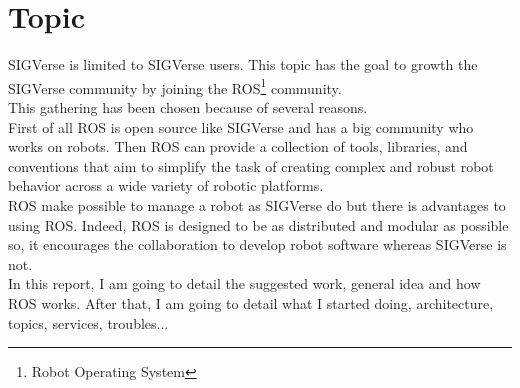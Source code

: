 \noindent\begin{minipage}{\linewidth}%
\label{fig:manVirtualWorld}%
\end{minipage}

\section{Topic}
SIGVerse is limited to SIGVerse users. This topic has the goal to growth the SIGVerse community by joining the ROS\footnote{Robot Operating System} community.\\
This gathering has been chosen because of several reasons.\\
First of all ROS is open source like SIGVerse and has a big community who works on robots. Then ROS can provide a collection of tools, libraries, and conventions that aim to simplify the task of creating complex and robust robot behavior across a wide variety of robotic platforms.\\
ROS make possible to manage a robot as SIGVerse do but there is advantages to using ROS. Indeed, ROS is designed to be as distributed and modular as possible so, it encourages the collaboration to develop robot software whereas SIGVerse is not.\\

In this report, I am going to detail the suggested work, general idea and how ROS works. After that, I am going to detail what I started doing, architecture, topics, services, troubles...